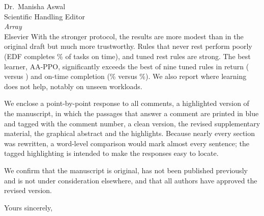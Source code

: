 \documentclass[11pt]{letter}
\begin{document}
\begin{letter}{Dr.\ Manisha Aswal\\Scientific Handling Editor\\\textit{Array}\\Elsevier}
With the stronger protocol, the results are more modest than in the original draft but much more trustworthy. Rules that never rest perform poorly (EDF completes \EDFOnTimePct\% of tasks on time), and tuned rest rules are strong. The best learner, AA-PPO, significantly exceeds the best of nine tuned rules in return (\PPOReturn{} versus \bestHeurReturn) and on-time completion (\PPOOnTimePct\% versus \bestHeurOnTimePct\%). We also report where learning does not help, notably on unseen workloads.

We enclose a point-by-point response to all comments, a highlighted version of the manuscript, in which the passages that answer a comment are printed in blue and tagged with the comment number, a clean version, the revised supplementary material, the graphical abstract and the highlights. Because nearly every section was rewritten, a word-level comparison would mark almost every sentence; the tagged highlighting is intended to make the responses easy to locate.

We confirm that the manuscript is original, has not been published previously and is not under consideration elsewhere, and that all authors have approved the revised version.

\closing{Yours sincerely,}
\end{letter}
\end{document}
